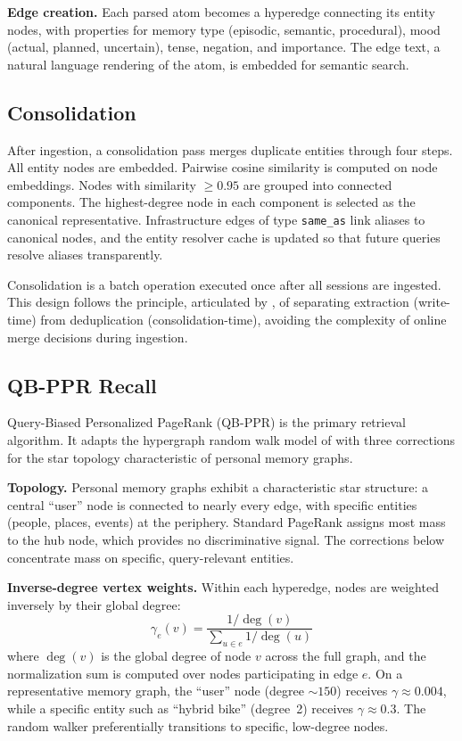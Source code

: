 \documentclass[11pt,a4paper]{article}
\begin{document}
\textbf{Edge creation.} Each parsed atom becomes a hyperedge connecting its entity nodes, with properties for memory type (episodic, semantic, procedural), mood (actual, planned, uncertain), tense, negation, and importance. The edge text, a natural language rendering of the atom, is embedded for semantic search.

\subsection{Consolidation}

After ingestion, a consolidation pass merges duplicate entities through four steps. All entity nodes are embedded. Pairwise cosine similarity is computed on node embeddings. Nodes with similarity $\geq 0.95$ are grouped into connected components. The highest-degree node in each component is selected as the canonical representative. Infrastructure edges of type \texttt{same\_as} link aliases to canonical nodes, and the entity resolver cache is updated so that future queries resolve aliases transparently.

Consolidation is a batch operation executed once after all sessions are ingested. This design follows the principle, articulated by \citet{stewart2026higher}, of separating extraction (write-time) from deduplication (consolidation-time), avoiding the complexity of online merge decisions during ingestion.

\subsection{QB-PPR Recall}

Query-Biased Personalized PageRank (QB-PPR) is the primary retrieval algorithm. It adapts the hypergraph random walk model of \citet{chitra2019random} with three corrections for the star topology characteristic of personal memory graphs.

\textbf{Topology.} Personal memory graphs exhibit a characteristic star structure: a central ``user'' node is connected to nearly every edge, with specific entities (people, places, events) at the periphery. Standard PageRank assigns most mass to the hub node, which provides no discriminative signal. The corrections below concentrate mass on specific, query-relevant entities.

\textbf{Inverse-degree vertex weights.} Within each hyperedge, nodes are weighted inversely by their global degree:
\begin{equation}
  \gamma_e(v) = \frac{1/\deg(v)}{\sum_{u \in e} 1/\deg(u)}
\end{equation}
where $\deg(v)$ is the global degree of node $v$ across the full graph, and the normalization sum is computed over nodes participating in edge $e$. On a representative memory graph, the ``user'' node (degree ${\sim}150$) receives $\gamma \approx 0.004$, while a specific entity such as ``hybrid bike'' (degree~2) receives $\gamma \approx 0.3$. The random walker preferentially transitions to specific, low-degree nodes.
\end{document}
